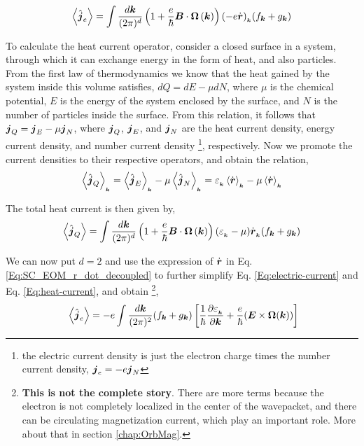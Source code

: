 \documentclass{report}
\renewcommand\vec[1]{\ensuremath\boldsymbol{#1}} %
\begin{document}
\begin{equation} \label{Eq:electric-current}
	\expval{\hat{\vec{j}}_e} = \int \frac{d\vec{k}}{(2\pi)^d} \left(1 + \frac{e}{\hbar} \vec{B} \cdot  \vec{\Omega}\left(\vec{k}\right)\right) (- e \dot{\vec{r}})_{_{\vec{k}}} ({f}_{\vec{k}} + {g}_{\vec{k}})
\end{equation}

To calculate the heat current operator, consider a closed surface in a system, through which it can exchange energy in the form of heat, and also particles. From the first law of thermodynamics we know that the heat gained by the system inside this volume satisfies, $dQ = dE - \mu dN$, where $\mu$ is the chemical potential, $E$ is the energy of the system enclosed by the surface, and $N$ is the number of particles inside the surface. From this relation, it follows that $\vec{j}_Q = \vec{j}_E - \mu \vec{j}_N$, where $\vec{j}_Q$, $\vec{j}_E$, and $\vec{j}_N$ are the heat current density, energy current density, and number current density \footnote{the electric current density is just the electron charge times the number current density, $\vec{j}_e = -e \vec{j}_N$}, respectively. Now we promote the current densities to their respective operators, and obtain the relation,
\begin{equation} 
	\expval{\hat{\vec{j}}_Q}_{_{\vec{k}}} = \expval{\hat{\vec{j}}_E}_{_{\vec{k}}} - \mu \expval{\hat{\vec{j}}_N}_{_{\vec{k}}} = \varepsilon_{_{\vec{k}}} \expval{\dot{\vec{r}}}_{_{\vec{k}}} - \mu \expval{\dot{\vec{r}}}_{_{\vec{k}}}
\end{equation}

The total heat current is then given by,
\begin{equation} \label{Eq:heat-current}
	\expval{\hat{\vec{j}}_Q} = \int \frac{d\vec{k}}{(2\pi)^d} \left(1 + \frac{e}{\hbar} \vec{B} \cdot  \vec{\Omega}\left(\vec{k}\right)\right) (\varepsilon_{_{\vec{k}}} - \mu) \dot{\vec{r}}_{_{\vec{k}}} ({f}_{\vec{k}} + {g}_{\vec{k}})
\end{equation}

We can now put $d = 2$ and use the expression of $\dot{\vec{r}}$ in Eq. \eqref{Eq:SC_EOM_r_dot_decoupled} to further simplify Eq. \eqref{Eq:electric-current} and Eq. \eqref{Eq:heat-current}, and obtain \footnote{\textbf{This is not the complete story}. There are more terms because the electron is not completely localized in the center of the wavepacket, and there can be circulating magnetization current, which play an important role. More about that in section \ref{chap:OrbMag}.},
\begin{equation}~\label{Eq:electric-current-simplified}
	\expval{\hat{\vec{j}}_e} = -e \int \frac{d\vec{k}}{(2\pi)^2} ({f}_{\vec{k}} + {g}_{\vec{k}}) \left[\frac{1}{\hbar} \frac{\partial \varepsilon_{_{\vec{k}}}}{\partial \vec{k}} + \frac{e}{\hbar} (\vec{E}\times\vec{\Omega}(\vec{k}))\right]
\end{equation}
\end{document}

